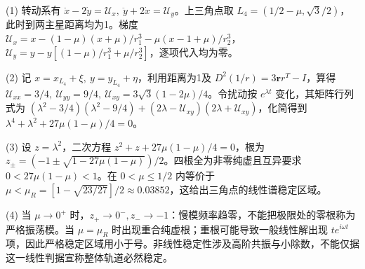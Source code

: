 (1) 转动系有 \(\ddot x-2\dot y=\mathcal U_x,\ \ddot y+2\dot x=\mathcal U_y\)。上三角点取 \(L_4=(1/2-\mu,\sqrt3/2)\)，此时到两主星距离均为1。梯度 \(\mathcal U_x=x-(1-\mu)(x+\mu)/r_1^3-\mu(x-1+\mu)/r_2^3\)，\(\mathcal U_y=y-y[(1-\mu)/r_1^3+\mu/r_2^3]\)，逐项代入均为零。

(2) 记 \(x=x_{L_4}+\xi,\ y=y_{L_4}+\eta\)，利用距离为1及 \(D^2(1/r)=3\boldsymbol rr^T-I\)，算得 \(\mathcal U_{xx}=3/4,\ \mathcal U_{yy}=9/4,\ \mathcal U_{xy}=3\sqrt3(1-2\mu)/4\)。令扰动按 \(e^{\lambda t}\) 变化，其矩阵行列式为 \((\lambda^2-3/4)(\lambda^2-9/4)+(2\lambda-\mathcal U_{xy})(2\lambda+\mathcal U_{xy})\)，化简得到 \(\lambda^4+\lambda^2+27\mu(1-\mu)/4=0\)。

(3) 设 \(z=\lambda^2\)，二次方程 \(z^2+z+27\mu(1-\mu)/4=0\)，根为 \(z_{\pm}=(-1\pm\sqrt{1-27\mu(1-\mu)})/2\)。四根全为非零纯虚且互异要求 \(0<27\mu(1-\mu)<1\)。在 \(0<\mu\le1/2\) 内等价于 \(\mu<\mu_R=[1-\sqrt{23/27}]/2\approx0.03852\)，这给出三角点的线性谱稳定区域。

(4) 当 \(\mu\to0^+\) 时，\(z_+\to0^-,z_-\to-1\)：慢模频率趋零，不能把极限处的零根称为严格振荡模。当 \(\mu=\mu_R\) 时出现重合纯虚根；重根可能导致一般线性解出现 \(te^{i\omega t}\) 项，因此严格稳定区域用小于号。非线性稳定性涉及高阶共振与小除数，不能仅据这一线性判据宣称整体轨道必然稳定。
